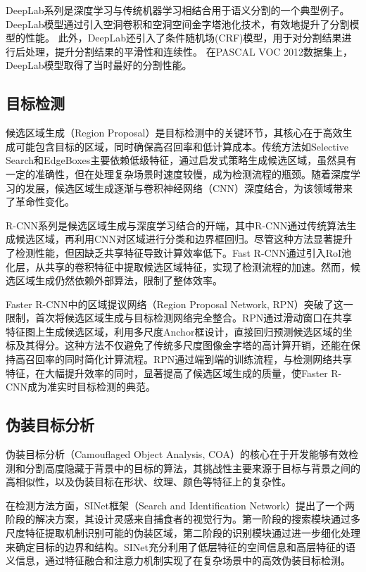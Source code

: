 \documentclass[a4paper,12pt]{ctexart}
\begin{document}
DeepLab\cite{Chen2016DeepLabSI}系列是深度学习与传统机器学习相结合用于语义分割的一个典型例子。
DeepLab模型通过引入空洞卷积和空洞空间金字塔池化技术，有效地提升了分割模型的性能。
此外，DeepLab还引入了条件随机场(CRF)模型，用于对分割结果进行后处理，提升分割结果的平滑性和连续性。
在PASCAL VOC 2012数据集上，DeepLab模型取得了当时最好的分割性能。

\subsection{目标检测}
候选区域生成（Region Proposal）是目标检测中的关键环节，其核心在于高效生成可能包含目标的区域，同时确保高召回率和低计算成本。传统方法如Selective Search和EdgeBoxes主要依赖低级特征，通过启发式策略生成候选区域，虽然具有一定的准确性，但在处理复杂场景时速度较慢，成为检测流程的瓶颈。随着深度学习的发展，候选区域生成逐渐与卷积神经网络（CNN）深度结合，为该领域带来了革命性变化。

R-CNN系列是候选区域生成与深度学习结合的开端，其中R-CNN\cite{Girshick2013RichFH}通过传统算法生成候选区域，再利用CNN对区域进行分类和边界框回归。尽管这种方法显著提升了检测性能，但因缺乏共享特征导致计算效率低下。Fast R-CNN\cite{Girshick2015FastR}通过引入RoI池化层，从共享的卷积特征中提取候选区域特征，实现了检测流程的加速。然而，候选区域生成仍然依赖外部算法，限制了整体效率。

Faster R-CNN\cite{Ren2015FasterRT}中的区域提议网络（Region Proposal Network, RPN）突破了这一限制，首次将候选区域生成与目标检测网络完全整合。RPN通过滑动窗口在共享特征图上生成候选区域，利用多尺度Anchor框设计，直接回归预测候选区域的坐标及其得分。这种方法不仅避免了传统多尺度图像金字塔的高计算开销，还能在保持高召回率的同时简化计算流程。RPN通过端到端的训练流程，与检测网络共享特征，在大幅提升效率的同时，显著提高了候选区域生成的质量，使Faster R-CNN成为准实时目标检测的典范。

\subsection{伪装目标分析}
伪装目标分析（Camouflaged Object Analysis, COA）的核心在于开发能够有效检测和分割高度隐藏于背景中的目标的算法，其挑战性主要来源于目标与背景之间的高相似性，以及伪装目标在形状、纹理、颜色等特征上的复杂性。

在检测方法方面，SINet框架\cite{Fan2020CamouflagedOD}（Search and Identification Network）提出了一个两阶段的解决方案，其设计灵感来自捕食者的视觉行为。第一阶段的搜索模块通过多尺度特征提取机制识别可能的伪装区域，第二阶段的识别模块通过进一步细化处理来确定目标的边界和结构。SINet充分利用了低层特征的空间信息和高层特征的语义信息，通过特征融合和注意力机制实现了在复杂场景中的高效伪装目标检测。
\end{document}
